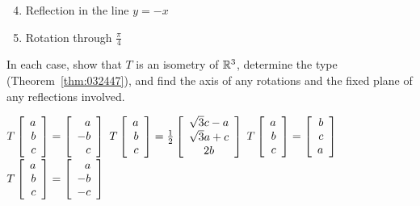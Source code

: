 \begin{multicols}{2}
\begin{ex}
\begin{sol}
\begin{enumerate}[label={\alph*.}]
\setcounter{enumi}{3}
\item  Reflection in the line $y = -x$

\setcounter{enumi}{5}
\item  Rotation through $ \frac{\pi}{4} $

\end{enumerate}
\end{sol}
\end{ex}

\begin{ex}
In each case, show that $T$ is an isometry of $\mathbb{R}^3$, determine the type (Theorem~\ref{thm:032447}), and find the axis of any rotations and the fixed plane of any reflections involved.
\begin{exenumerate}
\exitem* $T
\left[ \begin{array}{r}
a \\
b \\
c
\end{array} \right]
=
\left[ \begin{array}{r}
a \\
-b \\
c
\end{array} \right]$
\exitem* $T
\left[ \begin{array}{r}
a \\
b \\
c
\end{array} \right]
= \tfrac{1}{2}
\left[ \begin{array}{c}
\sqrt{3} c - a \\
\sqrt{3} a + c \\
2b
\end{array} \right]$
\exitem $T
\left[ \begin{array}{r}
a \\
b \\
c
\end{array} \right]
=
\left[ \begin{array}{r}
b \\
c \\
a
\end{array} \right]$
\exitem $T
\left[ \begin{array}{r}
a \\
b \\
c
\end{array} \right]
=
\left[ \begin{array}{r}
a \\
-b \\
-c
\end{array} \right]$

\end{exenumerate}
\end{ex}
\end{multicols}
